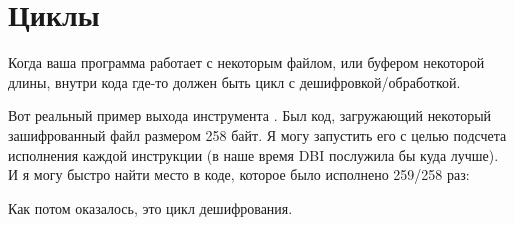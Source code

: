 \section{Циклы}

Когда ваша программа работает с некоторым файлом, или буфером некоторой длины,
внутри кода где-то должен быть цикл с дешифровкой/обработкой.

Вот реальный пример выхода инструмента \tracer.
Был код, загружающий некоторый зашифрованный файл размером 258 байт.
Я могу запустить его с целью подсчета исполнения каждой инструкции (в наше время \ac{DBI} послужила бы куда лучше).
И я могу быстро найти место в коде, которое было исполнено 259/258 раз:



Как потом оказалось, это цикл дешифрования.

